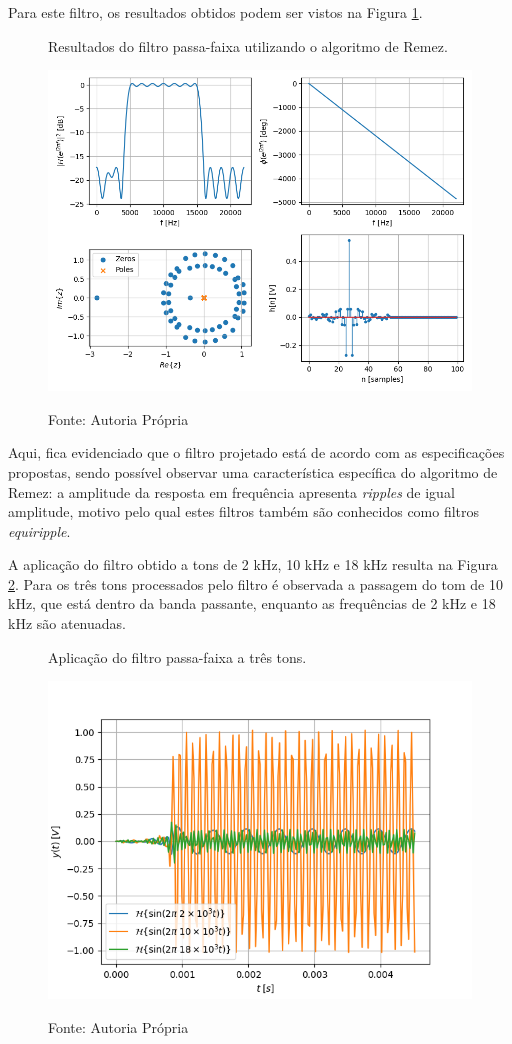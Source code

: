\documentclass[12pt,a4paper]{report}
\begin{document}
  Para este filtro, os resultados obtidos podem ser vistos na Figura \ref{fig:remez_results}.
  \begin{figure}[H]
    \caption{Resultados do filtro passa-faixa utilizando o algoritmo de Remez.}
    \centering
    \includegraphics[width=\textwidth]{images/remez_results}
    \label{fig:remez_results}
    \caption*{Fonte: Autoria Própria}
  \end{figure}

  Aqui, fica evidenciado que o filtro projetado está de acordo com as especificações propostas, sendo possível
  observar uma característica específica do algoritmo de Remez: a amplitude da resposta em frequência apresenta
  \textit{ripples} de igual amplitude, motivo pelo qual estes filtros também são conhecidos como filtros
  \textit{equiripple}.

  A aplicação do filtro obtido a tons de 2 kHz, 10 kHz e 18 kHz resulta na Figura \ref{fig:remez_tones}. Para os
  três tons processados pelo filtro é observada a passagem do tom de 10 kHz, que está dentro da banda passante,
  enquanto as frequências de 2 kHz e 18 kHz são atenuadas.
  \begin{figure}[H]
    \caption{Aplicação do filtro passa-faixa a três tons.}
    \centering
    \includegraphics[width=\textwidth]{images/remez_tones}
    \label{fig:remez_tones}
    \caption*{Fonte: Autoria Própria}
  \end{figure}
\end{document}
